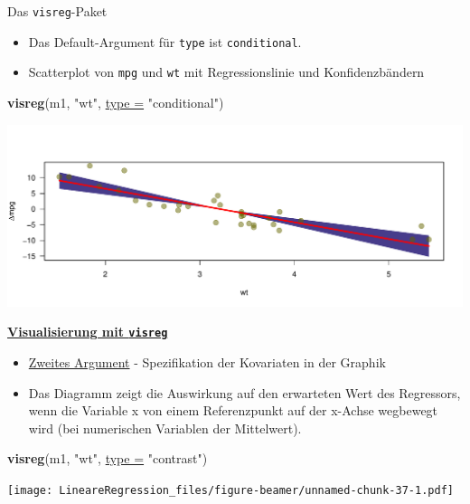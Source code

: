 \documentclass[
  ignorenonframetext,
]{beamer}
\newenvironment{Shaded}{\begin{snugshade}}{\end{snugshade}}
\newcommand{\DataTypeTok}[1]{\textcolor[rgb]{0.74,0.68,0.62}{\underline{#1}}}
\newcommand{\KeywordTok}[1]{\textcolor[rgb]{0.26,0.66,0.93}{\textbf{#1}}}
\newcommand{\NormalTok}[1]{\textcolor[rgb]{0.74,0.68,0.62}{#1}}
\newcommand{\StringTok}[1]{\textcolor[rgb]{0.02,0.61,0.04}{#1}}
\providecommand{\tightlist}{%
  \setlength{\itemsep}{0pt}\setlength{\parskip}{0pt}}
\begin{document}
\begin{frame}[fragile]{Das \texttt{visreg}-Paket}
\protect\hypertarget{das-visreg-paket-1}{}

\begin{itemize}
\tightlist
\item
  Das Default-Argument für \texttt{type} ist \texttt{conditional}.
\item
  Scatterplot von \texttt{mpg} und \texttt{wt} mit Regressionslinie und
  Konfidenzbändern
\end{itemize}

\begin{Shaded}
\begin{Highlighting}[]
\KeywordTok{visreg}\NormalTok{(m1, }\StringTok{"wt"}\NormalTok{, }\DataTypeTok{type =} \StringTok{"conditional"}\NormalTok{)}
\end{Highlighting}
\end{Shaded}

\includegraphics{LineareRegression_files/figure-beamer/unnamed-chunk-35-1.pdf}

\end{frame}

\begin{frame}[fragile]{\href{http://myweb.uiowa.edu/pbreheny/publications/visreg.pdf}{\textbf{Visualisierung
mit \texttt{visreg}}}}
\protect\hypertarget{visualisierung-mit-visreg}{}

\begin{itemize}
\tightlist
\item
  \href{http://pbreheny.github.io/visreg}{Zweites Argument} -
  Spezifikation der Kovariaten in der Graphik
\item
  Das Diagramm zeigt die Auswirkung auf den erwarteten Wert des
  Regressors, wenn die Variable x von einem Referenzpunkt auf der
  x-Achse wegbewegt wird (bei numerischen Variablen der Mittelwert).
\end{itemize}

\begin{Shaded}
\begin{Highlighting}[]
\KeywordTok{visreg}\NormalTok{(m1, }\StringTok{"wt"}\NormalTok{, }\DataTypeTok{type =} \StringTok{"contrast"}\NormalTok{)}
\end{Highlighting}
\end{Shaded}

\texttt{[image: LineareRegression\_files/figure-beamer/unnamed-chunk-37-1.pdf]}

\end{frame}
\end{document}

